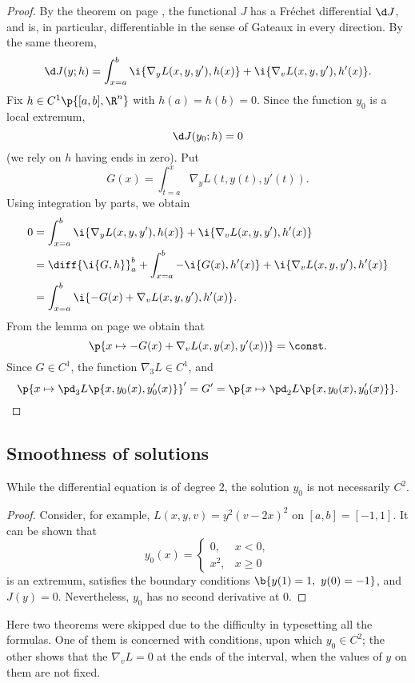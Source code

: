 \begin{proof}
  By the theorem on page \pageref{good functionals are Fréchet differentiable}, the functional $J$ has a Fréchet differential $\d J$, and is, in particular, differentiable in the sense of Gateaux in every direction.
  By the same theorem,
  $$ \d J(y; h) = \int_{x=a}^b \i{\nabla_y L(x, y, y'), h(x)} + \i{\nabla_v L(x, y, y'), h'(x)}. $$
    Fix $h \in C^1\p{[a, b], \R^n}$ with $h(a) = h(b) = 0$.
  Since the function $y_0$ is a local extremum,
  $$ \d J(y_0; h) = 0 $$
  (we rely on $h$ having ends in zero).
  Put
  $$ G(x) = \int_{t=a}^x  \nabla_y L(t, y(t), y'(t)). $$
  Using integration by parts, we obtain
  \begin{align*}
    0
    &=\int_{x=a}^b \i{\nabla_y L(x, y, y'), h(x)} + \i{\nabla_v L(x, y, y'), h'(x)} \\
    &= \diff{\i{G, h}}_a^b + \int_{x=a}^b -\i{G(x), h'(x)} + \i{\nabla_v L(x, y, y'), h'(x)} \\
    &= \int_{x=a}^b \i{-G(x)+\nabla_v L(x, y, y'), h'(x)}.
  \end{align*}
  From the lemma on page \pageref{DR for inner product} we obtain that
  $$ \p{x \mapsto -G(x)+\nabla_v L(x, y(x), y'(x))} = \const. $$
  Since $G \in C^1$, the function $\nabla_3L \in C^1$, and
  $$
  \p{x \mapsto \pd_3 L\p{x, y_0(x), y_0'(x)}}' = G'
  = \p{ x \mapsto \pd_2 L\p{x,y_0(x),y_0'(x)} }. $$
\end{proof}

\subsection{Smoothness of solutions}

\begin{remark}
  While the differential equation is of degree 2, the solution $y_0$ is not necessarily $C^2$.  
\end{remark}

\begin{proof}
  Consider, for example, $L(x, y, v) = y^2(v-2x)^2$ on $[a, b] = [-1, 1]$.
  It can be shown that
  $$ y_0(x) = 
  \begin{cases}
    0, & x < 0, \\
    x^2, & x\ge 0
  \end{cases}
  $$
  is an extremum, satisfies the boundary conditions $\b{y(1) = 1,\ y(0) = -1}$, and $J(y)=0$. Nevertheless, $y_0$ has no second derivative at 0.
\end{proof}

{\footnotesize Here two theorems were skipped due to the difficulty in typesetting all the formulas. One of them is concerned with conditions, upon which $y_0 \in C^2$; the other shows that the $\nabla_vL = 0$ at the ends of the interval, when the values of $y$ on them are not fixed.}

